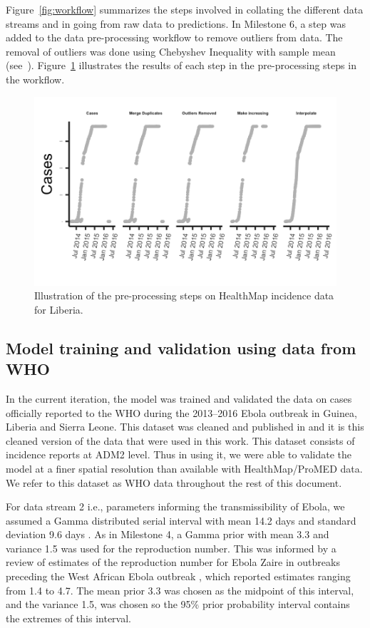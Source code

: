 \documentclass[11pt,]{article}
\begin{document}
Figure~\ref{fig:workflow} summarizes the steps involved in collating
the different data streams and in going from raw data to predictions. In Milestone 6, a step was added to the data pre-processing workflow
to remove outliers from data. The removal of outliers was done using Chebyshev Inequality
with sample mean (see~\citep{saw1984chebyshev}). Figure~\ref{fig:wf_example} illustrates
the results of each step in the pre-processing steps in the workflow.

\begin{figure}
  \centering
  \includegraphics[]{ms6-figures/liberia-preprocessing2}
  \caption{Illustration of the pre-processing steps on HealthMap incidence
    data for Liberia.}
  \label{fig:wf_example}
\end{figure}
\FloatBarrier

\subsection{Model training and validation using data from
WHO}\label{model-training-and-validation-using-data-from-who}

In the current iteration, the model was trained and validated the data
on cases officially reported to the WHO during the 2013--2016 Ebola
outbreak in Guinea, Liberia and Sierra Leone. This dataset was cleaned
and published in \citep{garske20160308} and it is this cleaned version
of the data that were used in this work. This dataset consists of
incidence reports at ADM2 level. Thus in using it, we were able to validate the model at a finer spatial resolution than available
with HealthMap/ProMED data. We refer to this dataset as WHO data
throughout the rest of this document.

For data stream 2 i.e., parameters informing the transmissibility of
Ebola, we assumed a Gamma distributed serial interval with mean 14.2
days and standard deviation 9.6 days \citep{team2015west}.
As in Milestone 4, a Gamma prior with mean 3.3 and variance 1.5 was
used for the reproduction number. This was informed by a review of estimates of the reproduction number for Ebola Zaire in outbreaks preceding the West African Ebola outbreak \citep{van2015review}, which reported estimates ranging from 1.4 to 4.7. The mean prior 3.3 was chosen as the midpoint of this interval, and the variance 1.5, was chosen so the 95\% prior probability interval contains the extremes of this interval.
\end{document}

